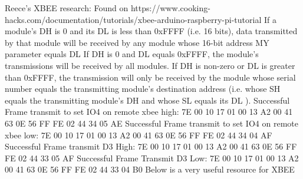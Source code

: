 \documentclass[fontsize=11pt, %
                             paper=letter, %
                             twoside, %
                             captions=tableheading,
                             index=totoc,
                             hyperref]{labbook}
\begin{document}
 Reece's XBEE research: 
 Found on https://www.cooking-hacks.com/documentation/tutorials/xbee-arduino-raspberry-pi-tutorial \newline 
 \newline If a module's DH is 0 and its DL is less than 0xFFFF (i.e. 16 bits), data transmitted by that module will be received by any module whose 16-bit address MY parameter equals DL \newline 
\newline If DH is 0 and DL equals 0xFFFF, the module's transmissions will be received by all modules. \newline 
\newline If DH is non-zero or DL is greater than 0xFFFF, the transmission will only be received by the module whose serial number equals the transmitting module's destination address (i.e. whose SH equals the transmitting module's DH and whose SL equals its DL ).
\newline 
\newline Successful Frame transmit to set IO4 on remote xbee high: 
\newline 7E 00 10 17 01 00 13 A2 00 41 63 0E 56 FF FE 02 44 34 05 AE
\newline 
\newline Successful Frame transmit to set IO4 on remote xbee low:
\newline 7E 00 10 17 01 00 13 A2 00 41 63 0E 56 FF FE 02 44 34 04 AF
\newline 
\newline Successful Frame transmit D3 High: 
\newline 7E 00 10 17 01 00 13 A2 00 41 63 0E 56 FF FE 02 44 33 05 AF
\newline Successful Frame Transmit D3 Low: 
\newline 7E 00 10 17 01 00 13 A2 00 41 63 0E 56 FF FE 02 44 33 04 B0
\newline Below is a very useful resource for XBEE 
\end{document}
